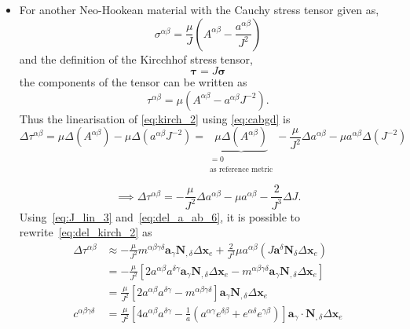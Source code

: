 \begin{itemize}
\item For another Neo-Hookean material with the Cauchy stress tensor given as, 
\begin{equation}\label{eq:sig_ab}
    \sigma^{\alpha \beta} = \frac{\mu}{J} \left( A^{\alpha \beta} - \frac{a^{\alpha \beta}}{J^{2}} \right) 
    \end{equation}
and the definition of the Kircchhof stress tensor,     
    \begin{equation}\label{eq:kirch}
    \boldsymbol{\tau} = J \boldsymbol{\sigma}
    \end{equation}
the components of the tensor can be written as
    \begin{equation}\label{eq:kirch_2}
    \tau^{\alpha \beta} = \mu \left( A^{\alpha \beta} - a^{\alpha \beta} J^{-2} \right).
    \end{equation}
Thus the linearisation of \eqref{eq:kirch_2} using \eqref{eq:cabgd} is
    \begin{equation}\label{eq:del_kirch}
        \Delta \tau^{\alpha \beta} = \mu \Delta \left( A^{\alpha \beta} \right) - \mu \Delta \left( a^{\alpha \beta} J^{-2} \right) = \underbrace{\mu \Delta \left( A^{\alpha \beta} \right)}_{\substack{= 0 \\ \text{as reference metric}}} - \frac{\mu}{J^{2}} \Delta a^{\alpha \beta} - \mu a^{\alpha \beta} \Delta \left( J^{-2} \right)
    \end{equation}
    
    \begin{equation}\label{eq:del_kirch_2}
    \implies \Delta \tau^{\alpha \beta} = - \frac{\mu}{J^{2}} \Delta a^{\alpha \beta} - \mu a^{\alpha \beta} - \frac{2}{J^{3}} \Delta J.
    \end{equation}
Using~\eqref{eq:J_lin_3} and~\eqref{eq:del_a_ab_6}, it is possible to rewrite~\eqref{eq:del_kirch_2} as
\begin{equation}\label{eq:del_kirch_3}
    \begin{split}
        \Delta \tau^{\alpha \beta} &\approx - \frac{\mu}{J^{2}} m^{\alpha \beta \gamma \delta} \boldsymbol{a}_{\gamma} \mathbf{N}_{, \delta} \Delta \mathbf{x}_{e} + \frac{2}{J^{3}} \mu a^{\alpha \beta} \left( J \boldsymbol{a}^{\delta} \mathbf{N}_{\delta} \Delta \mathbf{x}_{e} \right) \\ &= - \frac{\mu}{J^{2}} \left[ 2 a^{\alpha \beta} a^{\delta \gamma} \boldsymbol{a}_{\gamma} \mathbf{N}_{, \delta} \Delta \mathbf{x}_{e} - m^{\alpha \beta \gamma \delta} \boldsymbol{a}_{\gamma} \mathbf{N}_{, \delta} \Delta \mathbf{x}_{e}\right] \\ &= \frac{\mu}{J^{2}} \left[ 2 a^{\alpha \beta} a^{\delta \gamma} - m^{\alpha \beta \gamma \delta} \right] \boldsymbol{a}_{\gamma} \mathbf{N}_{, \delta} \Delta \mathbf{x}_{e} \\ 
        c^{\alpha \beta \gamma \delta} &= \frac{\mu}{J^{2}} \left[ 4 a^{\alpha \beta} a^{\delta \gamma} - \frac{1}{a} \left( a^{\alpha \gamma} e^{\delta \beta} + e^{\alpha \delta} e^{\gamma \beta}\right)  \right] \boldsymbol{a}_{\gamma} \cdot \mathbf{N}_{, \delta} \Delta \mathbf{x}_{e}
    \end{split}
\end{equation}
\end{itemize}
